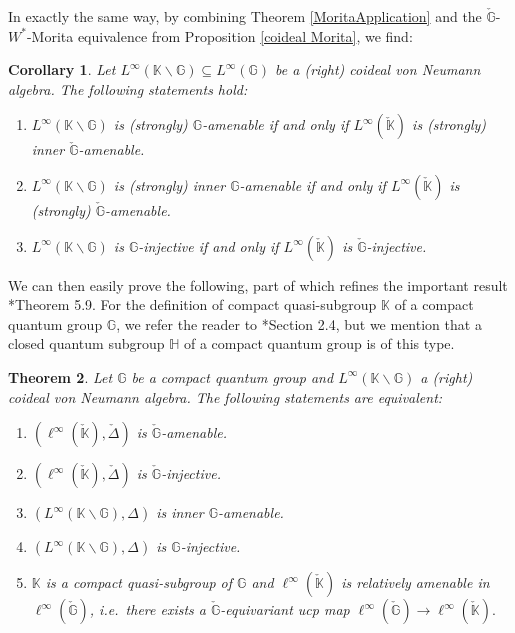 \documentclass[reqno]{amsart}
\numberwithin{equation}{section}
\newtheorem{Theorem}{Theorem}[section]
\newtheorem{Cor}[Theorem]{Corollary}
\newcommand{\G}{\mathbb{G}}
\begin{document}
In exactly the same way, by combining Theorem \ref{MoritaApplication} and the $\check{\G}$-$W^*$-Morita equivalence from Proposition \ref{coideal Morita}, we find:

\begin{Cor}\label{app2}
    Let $L^\infty(\mathbb{K}\backslash \G)\subseteq L^\infty(\G)$ be a (right) coideal von Neumann algebra. The following statements hold:
    \begin{enumerate}\setlength\itemsep{-0.5em}
        \item $L^\infty(\mathbb{K}\backslash \G)$ is (strongly) $\G$-amenable if and only if $L^\infty(\check{\mathbb{K}})$ is (strongly) inner $\check{\G}$-amenable.
        \item $L^\infty(\mathbb{K}\backslash \G)$ is (strongly) inner $\G$-amenable if and only if $L^\infty(\check{\mathbb{K}})$ is (strongly) $\check{\G}$-amenable.
        \item $L^\infty(\mathbb{K}\backslash \G)$ is $\G$-injective if and only if $L^\infty(\check{\mathbb{K}})$ is $\check{\G}$-injective.
    \end{enumerate}
\end{Cor}

We can then easily prove the following, part of which refines the important result \cite{AK24}*{Theorem 5.9}. For the definition of compact quasi-subgroup $\mathbb{K}$ of a compact quantum group $\G$, we refer the reader to \cite{AK24}*{Section 2.4}, but we mention that a closed quantum subgroup $\mathbb{H}$ of a compact quantum group is of this type.
\begin{Theorem}\label{main}
Let $\G$ be a compact quantum group and $L^\infty(\mathbb{K}\backslash \G)$ a (right) coideal von Neumann algebra. The following statements are equivalent:
\begin{enumerate}\setlength\itemsep{-0.5em}
    \item $(\ell^\infty(\check{\mathbb{K}}), \check{\Delta})$ is $\check{\G}$-amenable.
    \item $(\ell^\infty(\check{\mathbb{K}}), \check{\Delta})$ is $\check{\G}$-injective.
    \item $(L^\infty(\mathbb{K}\backslash \G), \Delta)$ is inner $\G$-amenable.
    \item $(L^\infty(\mathbb{K}\backslash \G), \Delta)$ is $\G$-injective.
    \item $\mathbb{K}$ is a compact quasi-subgroup of $\G$ and $\ell^\infty(\check{\mathbb{K}})$ is relatively amenable in $\ell^\infty(\check{\G})$, i.e.\ there exists a $\check{\G}$-equivariant ucp map $\ell^\infty(\check{\G})\to \ell^\infty(\check{\mathbb{K}}).$
\end{enumerate}
\end{Theorem}
\end{document}
